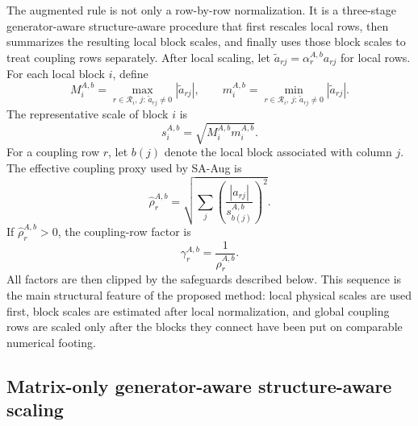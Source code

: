 \documentclass[AMA,Times1COL]{WileyNJDv5} %
\newcommand{\abs}[1]{\left\lvert #1 \right\rvert}
\newcommand{\methodAug}{SA-Aug}
\providecommand{\DIFadd}[1]{{\protect\color{blue} \sf #1}} %
\providecommand{\DIFdel}[1]{{\protect\color{red} \scriptsize #1}} %
\providecommand{\DIFaddbegin}{} %
\providecommand{\DIFaddend}{} %
\providecommand{\DIFdelbegin}{} %
\providecommand{\DIFdelend}{} %
\begin{document}
The augmented rule is not only a row-by-row normalization. It is a three-stage
\DIFdelbegin \DIFdel{generator-aware }\DIFdelend \DIFaddbegin \DIFadd{structure-aware }\DIFaddend procedure that first rescales local rows, then summarizes the resulting
local block scales, and finally uses those block scales to treat coupling rows separately.
After local scaling, let $\widetilde a_{rj}=\alpha_r^{A,b}a_{rj}$ for local rows. For each
local block $i$, define
\DIFdelbegin %
\DIFdelend \DIFaddbegin \begin{equation}
M_i^{A,b}
=
\max_{r\in\mathcal{R}_i,\,j:\,\widetilde a_{rj}\neq 0}
\abs{\widetilde a_{rj}},
\qquad
m_i^{A,b}
=
\min_{r\in\mathcal{R}_i,\,j:\,\widetilde a_{rj}\neq 0}
\abs{\widetilde a_{rj}}.
\label{eq:augmented-block-extremes}
\end{equation}\DIFaddend 
The representative scale of block $i$ is
\begin{equation}
s_i^{A,b}=\sqrt{M_i^{A,b}m_i^{A,b}}.
\label{eq:augmented-block-scale}
\end{equation}
For a coupling row $r$, let $b(j)$ denote the local block associated with column $j$.
The effective coupling proxy used by \methodAug{} is
\begin{equation}
\widehat\rho_r^{A,b}
=
\sqrt{
\sum_j
\left(
\frac{\abs{a_{rj}}}{s_{b(j)}^{A,b}}
\right)^2
}.
\label{eq:augmented-coupling-rho}
\end{equation}
If $\widehat\rho_r^{A,b}>0$, the coupling-row factor is
\begin{equation}
\gamma_r^{A,b}=\frac{1}{\widehat\rho_r^{A,b}}.
\label{eq:augmented-coupling-factor}
\end{equation}
All factors are then clipped by the safeguards described below. This sequence is the
main structural feature of the proposed method: local physical scales are used first,
block scales are estimated after local normalization, and global coupling rows are scaled
only after the blocks they connect have been put on comparable numerical footing.

\subsection{Matrix-only \DIFdelbegin \DIFdel{generator-aware }\DIFdelend \DIFaddbegin \DIFadd{structure-aware }\DIFaddend scaling}
\label{subsec:strategy-2}
\end{document}
